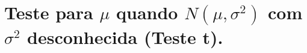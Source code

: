 \documentclass[8pt]{beamer}
\begin{document}
%	
%	
%	
%	
%	
%

\section{Teste para $\mu$ quando $N(\mu, \sigma^2)$ com $\sigma^2$ desconhecida (Teste t).}
\end{document}
